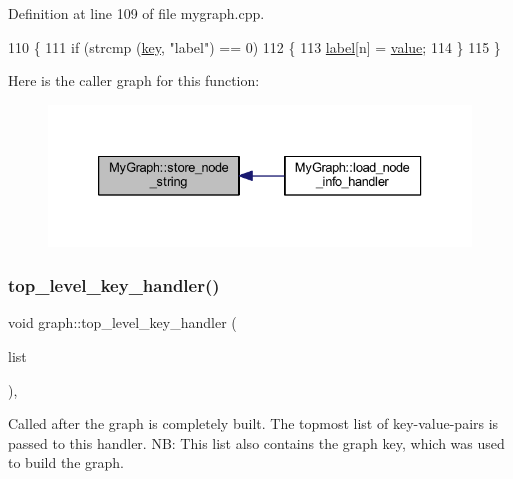 Definition at line 109 of file mygraph.\+cpp.


\begin{DoxyCode}
110 \{
111     \textcolor{keywordflow}{if} (strcmp (\mbox{\hyperlink{struct_g_m_l__pair_a00e5de36c09fef63b8d439b4341f0655}{key}}, \textcolor{stringliteral}{"label"}) == 0)
112     \{
113         \mbox{\hyperlink{class_my_graph_a5c9923e2b43cb5a3139715acc34b8ca8}{label}}[n] = \mbox{\hyperlink{struct_g_m_l__pair_aef8797e7d2fc0d2e2f628ce9c2783a6c}{value}};
114     \}
115 \}
\end{DoxyCode}
Here is the caller graph for this function\+:
\nopagebreak
\begin{figure}[H]
\begin{center}
\leavevmode
\includegraphics[width=333pt]{class_my_graph_a1ca3d219454d57b8fc5ce67eaaf33013_icgraph}
\end{center}
\end{figure}
\mbox{\label{classgraph_a33bc9b45f0d4738c491535147b703cc5}} 
\subsubsection{\texorpdfstring{top\+\_\+level\+\_\+key\+\_\+handler()}{top\_level\_key\_handler()}}
{\footnotesize\ttfamily void graph\+::top\+\_\+level\+\_\+key\+\_\+handler (\begin{DoxyParamCaption}\item[{\mbox{\hyperlink{struct_g_m_l__pair}{G\+M\+L\+\_\+pair}} $\ast$}]{list }\end{DoxyParamCaption})\hspace{0.3cm}{\ttfamily [virtual]}, {\ttfamily [inherited]}}

Called after the graph is completely built. The topmost list of key-\/value-\/pairs is passed to this handler. NB\+: This list also contains the graph key, which was used to build the graph.


